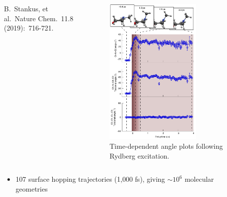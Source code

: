 \documentclass{beamer}
\begin{document}
\begin{frame}
\begin{columns}
\begin{column}{.4\textwidth}
\begin{itemize}
		\end{itemize}
		{\tiny B.\ Stankus, et al.\ Nature Chem.\ 11.8 (2019):\ 716-721.}
		\end{column}
		\begin{column}{.6\textwidth}
			\begin{figure}[H]
				\centering
				\includegraphics[width=0.7\textwidth]{stankus_angle_plots.png}
				\caption{Time-dependent angle plots
					following Rydberg excitation.}
				\label{fig:nmm-geom}
			\end{figure}
		\end{column}%
		
	\end{columns}
\end{frame}

\begin{frame}
	\begin{columns} 
		\begin{column}{.5\textwidth}
			\begin{itemize}

				\item 107 surface hopping trajectories (1,000 fs), giving $\sim$$10^6$ molecular geometries 
				
			\end{itemize}
		\end{column}
		\begin{column}{.5\textwidth}

		\end{column}%
		
	\end{columns}
\end{frame}
\end{document}
